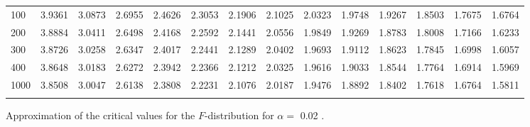 {\begin{tabular}{l|lllllllllllll}
\\ 
100 & 3.9361 & 3.0873 & 2.6955 & 2.4626 & 2.3053 & 2.1906 & 2.1025 & 2.0323 & 1.9748 & 1.9267 & 1.8503 & 1.7675 & 1.6764 \\[5pt] \arrayrulecolor{light-gray}\hline\arrayrulecolor{black}  
200 & 3.8884 & 3.0411 & 2.6498 & 2.4168 & 2.2592 & 2.1441 & 2.0556 & 1.9849 & 1.9269 & 1.8783 & 1.8008 & 1.7166 & 1.6233 \\[5pt] \arrayrulecolor{light-gray}\hline\arrayrulecolor{black}  
300 & 3.8726 & 3.0258 & 2.6347 & 2.4017 & 2.2441 & 2.1289 & 2.0402 & 1.9693 & 1.9112 & 1.8623 & 1.7845 & 1.6998 & 1.6057 \\[5pt] \arrayrulecolor{light-gray}\hline\arrayrulecolor{black}  
400 & 3.8648 & 3.0183 & 2.6272 & 2.3942 & 2.2366 & 2.1212 & 2.0325 & 1.9616 & 1.9033 & 1.8544 & 1.7764 & 1.6914 & 1.5969 \\[5pt] \arrayrulecolor{light-gray}\hline\arrayrulecolor{black}  
1000 & 3.8508 & 3.0047 & 2.6138 & 2.3808 & 2.2231 & 2.1076 & 2.0187 & 1.9476 & 1.8892 & 1.8402 & 1.7618 & 1.6764 & 1.5811 \\[5pt] \arrayrulecolor{light-gray}\hline\arrayrulecolor{black}  
\end{tabular}}
\clearpage

Approximation of the critical values for the $F$-distribution for $\alpha=$ 0.02 . 

